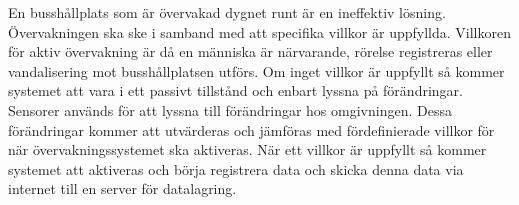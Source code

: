 En busshållplats som är övervakad dygnet runt är en ineffektiv lösning. Övervakningen ska ske i samband med att specifika villkor är uppfyllda. Villkoren för aktiv övervakning är då en människa är närvarande, rörelse registreras eller vandalisering mot busshållplatsen utförs. Om inget villkor är uppfyllt så kommer systemet att vara i ett passivt tillstånd och enbart lyssna på förändringar.\\

Sensorer används för att lyssna till förändringar hos omgivningen. Dessa förändringar kommer att utvärderas och jämföras med fördefinierade villkor för när övervakningssystemet ska aktiveras. När ett villkor är uppfyllt så kommer systemet att aktiveras och börja registrera data och skicka denna data via internet till en server för datalagring.\\


